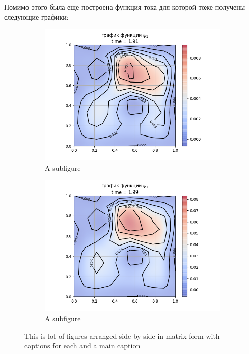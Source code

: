 \documentclass[14pt]{extreport}
\begin{document}
Помимо этого была еще построена функция тока для которой тоже получены следующие графики:




\begin{figure}[htb]
\centering
  \begin{subfigure}[b]{.24\linewidth}
    \centering
    \includegraphics[width=1.5\linewidth]{images/ex3/psi/91}
    \caption{A subfigure}\label{img:ex3:psi:91}
  \end{subfigure}%
  \begin{subfigure}[b]{.24\linewidth}
    \centering
    \includegraphics[width=1.5\linewidth]{images/ex3/psi/99}
    \caption{A subfigure}\label{img:ex3:psi:99}
  \end{subfigure}%

  \caption{This is   lot of figures arranged side by side in matrix form with captions for each and a main caption}\label{fig:1}
\end{figure}
\end{document}

